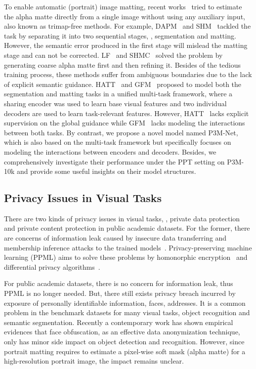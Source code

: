 \documentclass[sigconf]{acmart}
\begin{document}
To enable automatic (portrait) image matting, recent works~\cite{shm,lf,hatt,gfm,aim} tried to estimate the alpha matte directly from a single image without using any auxiliary input, also known as trimap-free methods. For example, DAPM~\cite{dapm} and SHM~\cite{shm} tackled the task by separating it into two sequential stages, , segmentation and matting. However, the semantic error produced in the first stage will mislead the matting stage and can not be corrected. LF~\cite{lf} and SHMC~\cite{shmc} solved the problem by generating coarse alpha matte first and then refining it. Besides of the tedious training process, these methods suffer from ambiguous boundaries due to the lack of explicit semantic guidance. HATT~\cite{hatt} and GFM~\cite{gfm} proposed to model both the segmentation and matting tasks in a unified multi-task framework, where a sharing encoder was used to learn base visual features and two individual decoders are used to learn task-relevant features. However, HATT~\cite{hatt} lacks explicit supervision on the global guidance while GFM~\cite{gfm} lacks modeling the interactions between both tasks. By contrast, we propose a novel model named P3M-Net, which is also based on the multi-task framework but specifically focuses on modeling the interactions between encoders and decoders. Besides, we comprehensively investigate their performance under the PPT setting on P3M-10k and provide some useful insights on their model structures. 

\subsection{Privacy Issues in Visual Tasks}
There are two kinds of privacy issues in visual tasks, , private data protection and private content protection in public academic datasets. For the former, there are concerns of information leak caused by insecure data transferring and membership inference attacks to the trained models~\cite{shokri2017membership,hisamoto2020membership,fredrikson2015model,carlini2019secret}. Privacy-preserving machine learning (PPML) aims to solve these problems by homonorphic encryption~\cite{erkin2009privacy,yonetani2017privacy} and differential privacy algorithms~\cite{NEURIPS2020_fc4ddc15,abadi2016deep}.

For public academic datasets, there is no concern for information leak, thus PPML is no longer needed. But, there still exists privacy breach incurred by exposure of personally identifiable information,  faces, addresses. It is a common problem in the benchmark datasets for many visual tasks,  object recognition and semantic segmentation. Recently a contemporary work \cite{yang2021study} has shown empirical evidences that face obfuscation, as an effective data anonymization technique, only has minor side impact on object detection and recognition. However, since portrait matting requires to estimate a pixel-wise soft mask (alpha matte) for a high-resolution portrait image, the impact  remains unclear.
\end{document}
